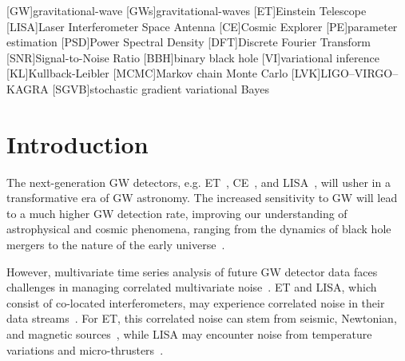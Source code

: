 \documentclass[%
 reprint,
 amsmath,amssymb,
 aps,
 nofootinbib,
]{revtex4-2}
\begin{document}
\maketitle


\begin{acronym}
    [GW]{gravitational-wave}
    [GWs]{gravitational-waves}
    [ET]{Einstein Telescope}
    [LISA]{Laser Interferometer Space Antenna}
    [CE]{Cosmic Explorer}
    [PE]{parameter estimation}
    [PSD]{Power Spectral Density}
    [DFT]{Discrete Fourier Transform}
    [SNR]{Signal-to-Noise Ratio}
    [BBH]{binary black hole}
    [VI]{variational inference}
    [KL]{Kullback-Leibler}
    [MCMC]{Markov chain Monte Carlo}
    [LVK]{LIGO--VIRGO--KAGRA}
    [SGVB]{stochastic gradient variational Bayes}
\end{acronym}


\section{Introduction}

The next-generation \ac{GW} detectors, e.g. \ac{ET}~\cite{Punturo_2010}, \ac{CE}~\cite{CE_horizon_study}, and \ac{LISA}~\cite{LISA_science_case}, will usher in a transformative era of \ac{GW} astronomy.
The increased sensitivity to \ac{GW} will lead to a much higher \ac{GW} detection rate, improving our understanding of astrophysical and cosmic phenomena, ranging from the dynamics of black hole mergers to the nature of the early universe~\cite{ET_science_case, Maggiore_2020_ET_science_case, Branchesi_2023_ET_science_case, CE_horizon_study, LISA_science_case}.

However, multivariate time series analysis of future GW detector data faces challenges in managing correlated multivariate noise~\cite{ET_design_report,LISA_red_book}.
\ac{ET} and \ac{LISA}, which consist of co-located interferometers, may experience correlated noise in their data streams~\cite{Janssens2023}.
For \ac{ET}, this correlated noise can stem from seismic, Newtonian, and magnetic sources~\cite{Janssens_newtonian_seismic, PhysRevD.109.102002,Ball_lightning_strokes, Janssens_magnetic_noise}, while \ac{LISA}  may encounter noise from temperature variations and micro-thrusters~\cite{lisa_temp_noise,lisa_thrusters_noise}.
\end{document}
